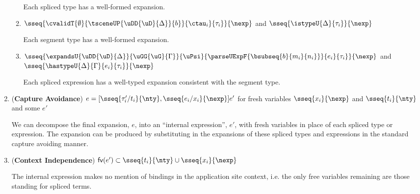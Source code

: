 \documentclass[acmsmall]{acmart}
\begin{document}
\begin{theorem}
\begin{enumerate}[nolistsep,leftmargin=10pt,label={\arabic*.}]
\begin{enumerate}
\begin{grayparbox}
          Each spliced type has a well-formed expansion.
          \end{grayparbox}
  \item $\sseq{
    \cvalidT{\emptyset}{
      \tsceneUP
        {\uDD
          {\uD}{\Delta}
        }{b}
    }{
      \ctau_i
    }{\tau_i}
  }{\nexp}$ and $\sseq{\istypeU{\Delta}{\tau_i}}{\nexp}$
        \begin{grayparbox}
        Each segment type has a well-formed expansion.
        \end{grayparbox}
  \item $\sseq{
    \expandsU
      {\uDD{\uD}{\Delta}}
      {\uGG{\uG}{\Gamma}}
      {\uPsi}
      {\parseUExpF{\bsubseq{b}{m_i}{n_i}}}
      {e_i}
      {\tau_i}
  }{\nexp}$ and $\sseq{\hastypeU{\Delta}{\Gamma}{e_i}{\tau_i}}{\nexp}$\vspace{-5px}
        \begin{grayparbox}
        Each spliced expression has a well-typed expansion consistent with the segment type.
        \end{grayparbox}
\end{enumerate}
\item (\textbf{Capture Avoidance}) $e = [\sseq{\tau'_i/t_i}{\nty}, \sseq{e_i/x_i}{\nexp}]e'$ for fresh variables $\sseq{x_i}{\nexp}$ and $\sseq{t_i}{\nty}$ and some $e'$
    \begin{grayparbox}
      We can decompose the final expansion, $e$, into an ``internal expression'', $e'$, with fresh variables in place of each spliced type or expression. The expansion can be produced by substituting in the expansions of these spliced types and expressions in the standard capture avoiding manner.
    \end{grayparbox}
\item (\textbf{Context Independence}) $\mathsf{fv}(e') \subset \sseq{t_i}{\nty} \cup \sseq{x_i}{\nexp}$
      \begin{grayparbox}
      The internal expression makes no mention of bindings in the application site context, i.e. the only free variables remaining are those standing for spliced terms.
      \end{grayparbox}
\end{enumerate}
\end{theorem}


\end{document}
